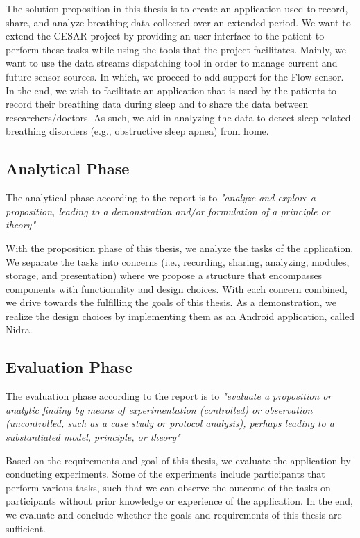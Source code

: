 The solution proposition in this thesis is to create an application used to record, share, and analyze breathing data collected over an extended period. We want to extend the CESAR project by providing an user-interface to the patient to perform these tasks while using the tools that the project facilitates. Mainly, we want to use the data streams dispatching tool in order to manage current and future sensor sources. In which, we proceed to add support for the Flow sensor. In the end, we wish to facilitate an application that is used by the patients to record their breathing data during sleep and to share the data between researchers/doctors. As such, we aid in analyzing the data to detect sleep-related breathing disorders (e.g., obstructive sleep apnea) from home. 

\subsection{Analytical Phase}
The analytical phase according to the report is to \textit{"analyze and explore a proposition, leading to a demonstration and/or formulation of a principle or theory"}

With the proposition phase of this thesis, we analyze the tasks of the application. We separate the tasks into concerns (i.e., recording, sharing, analyzing, modules, storage, and presentation) where we propose a structure that encompasses components with functionality and design choices. With each concern combined, we drive towards the fulfilling the goals of this thesis. As a demonstration, we realize the design choices by implementing them as an Android application, called Nidra. 

\subsection{Evaluation Phase}
The evaluation phase according to the report is to \textit{"evaluate a proposition or analytic finding by means of experimentation (controlled) or observation (uncontrolled, such as a case study or protocol analysis), perhaps leading to a substantiated model, principle, or theory"}

Based on the requirements and goal of this thesis, we evaluate the application by conducting experiments. Some of the experiments include participants that perform various tasks, such that we can observe the outcome of the tasks on participants without prior knowledge or experience of the application. In the end, we evaluate and conclude whether the goals and requirements of this thesis are sufficient.

